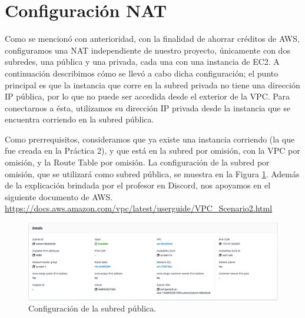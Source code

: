 \documentclass{article}
\begin{document}
\section{Configuraci\'on NAT}

Como se mencion\'o con anterioridad, con la finalidad
de ahorrar cr\'editos de AWS, configuramos una NAT
independiente de nuestro proyecto, \'unicamente con
dos subredes, una p\'ublica y una privada, cada una
con una instancia de EC2.   A continuaci\'on describimos
c\'omo se llev\'o a cabo dicha configuraci\'on; el punto
principal es que la instancia que corre en la subred
privada no tiene una direcci\'on IP p\'ublica, por lo
que no puede ser accedida desde el exterior de la VPC.
Para conectarnos a \'esta, utilizamos su direcci\'on
IP privada desde la instancia que se encuentra corriendo
en la subred p\'ublica.

Como prerrequisitos, consideramos que ya existe una
instancia corriendo (la que fue creada en la Pr\'actica
2), y que est\'a en la subred por omisi\'on, con la
VPC por omisi\'on, y la Route Table por omisi\'on.
La configuraci\'on de la subred por omisi\'on, que se
utilizar\'a como subred p\'ublica, se muestra en la
Figura \ref{fig:NAT-pubSubnet}.   Adem\'as de la
explicaci\'on brindada por el profesor en Discord,
nos apoyamos en el siguiente documento de AWS.
\href{https://docs.aws.amazon.com/vpc/latest/userguide/VPC_Scenario2.html}{https://docs.aws.amazon.com/vpc/latest/userguide/VPC\_Scenario2.html}

\begin{figure}[H]
  \centering
  \includegraphics[width=\textwidth]{SSNAT/publicSubnet}
  \caption{Configuraci\'on de la subred p\'ublica.}
  \label{fig:NAT-pubSubnet}
\end{figure}
\end{document}
